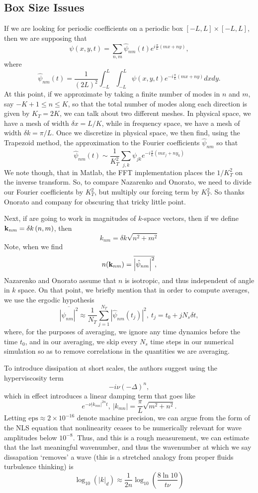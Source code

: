 \documentclass[a4paper,11pt]{article}
\begin{document}
\subsection*{Box Size Issues}
If we are looking for periodic coefficients on a periodic box $[-L,L]\times[-L,L]$, then we are supposing that
\[
\psi(x,y,t) = \sum_{n,m}\hat{\psi}_{nm}(t) e^{i\frac{\pi}{L}(mx + ny)}, 
\]
where
\[
 \hat{\psi}_{nm}(t) = \frac{1}{(2L)^{2}}\int_{-L}^{L}\int_{-L}^{L} \psi(x,y,t) e^{-i\frac{\pi}{L}(mx + ny)} dxdy.
\]
At this point, if we approximate by taking a finite number of modes in $n$ and $m$, say $-K+1\leq n \leq K$, so that the total number of modes along each direction is given by $K_{T}=2K$, we can talk about two different meshes.  In physical space, we have a mesh of width $\delta x = L/K$, while in frequency space, we have a mesh of width $\delta k = \pi/L$.  Once we discretize in physical space, we then find, using the Trapezoid method, the approximation to the Fourier coefficients $\hat{\psi}_{nm}$ so that 
\[
\hat{\psi}_{nm}(t) \sim \frac{1}{K_{T}^{2}}\sum_{j,k}\psi_{jk}e^{-i\frac{\pi}{L}(mx_{j} + ny_{k})}
\]
We note though, that in Matlab, the FFT implementation places the $1/K_{T}^{2}$ on the inverse transform.  So, to compare Nazarenko and Onorato, we need to divide our Fourier coefficients by $K_{T}^{2}$, but multiply our forcing term by $K_{T}^{2}$.  So thanks Onorato and company for obscuring that tricky little point. 

Next, if are going to work in magnitudes of $k$-space vectors, then if we define ${\bf k}_{nm} = \delta k \left(n,m \right)$, then 
\[
k_{nm} = \delta k \sqrt{n^{2}+m^{2}}
\]
Note, when we find 
\[
n({\bf k}_{nm}) = \overline{\left| \hat{\psi}_{nm}\right|^{2}}, 
\]
Nazarenko and Onorato assume that $n$ is isotropic, and thus independent of angle in $k$ space.  On that point, we briefly mention that in order to compute averages, we use the ergodic hypothesis
\[
\overline{\left| \hat{\psi}_{nm}\right|^{2}} \approx \frac{1}{N_{T}} \sum_{j=1}^{N_{T}} \left| \hat{\psi}_{nm}(t_{j})\right|^{2}, ~ t_{j} = t_{0} + j N_{s}\delta t,
\]
where, for the purposes of averaging, we ignore any time dynamics before the time $t_{0}$, and in our averaging, we skip every $N_{s}$ time steps in our numerical simulation so as to remove correlations in the quantities we are averaging.  
 
To introduce dissipation at short scales, the authors suggest using the hyperviscosity term 
\[
-i\nu\left(-\Delta\right)^{n},
\]
which in effect introduces a linear damping term that goes like 
\[
e^{-\nu |k_{mn}|^{2n}t}, ~ |k_{mn}| = \frac{\pi}{L}\sqrt{m^{2}+n^{2}}.
\]
Letting $\mbox{eps}\approx 2\times 10^{-16}$ denote machine precision, we can argue from the form of the NLS equation that nonlinearity ceases to be numerically relevant for wave amplitudes below $10^{-8}$.  Thus, and this is a rough measurement, we can estimate that the last meaningful wavenumber, and thus the wavenumber at which we say dissapation `removes'  a wave (this is a stretched analogy from proper fluids turbulence thinking) is 
\[
\log_{10}\left(|k|_{d}\right) \approx \frac{1}{2n}\log_{10}\left(\frac{8\ln 10}{t\nu} \right)
\]
\end{document}
